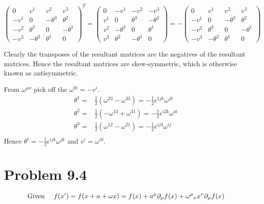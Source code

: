 \documentclass{article}
\begin{document}
\[\begin{pmatrix}0&v^1&v^2&v^3\\-v^1&0&-\theta^3&\theta^2\\-v^2&\theta^3&0&-\theta^1\\-v^3&-\theta^2&\theta^1&0\end{pmatrix}^T=\begin{pmatrix}0&-v^1&-v^2&-v^3\\v^1&0&\theta^3&-\theta^2\\v^2&-\theta^3&0&\theta^1\\v^3&\theta^2&-\theta^1&0\end{pmatrix}=-\begin{pmatrix}0&v^1&v^2&v^3\\-v^1&0&-\theta^3&\theta^2\\-v^2&\theta^3&0&-\theta^1\\-v^3&-\theta^2&\theta^1&0\end{pmatrix}\]

Clearly the transposes of the resultant matrices are the negatives of the resultant matrices. Hence the resultant matrices are skew-symmetric, which is otherwise known as antisymmetric. 

From $\omega^{\mu\nu}$ pick off the $\omega^{0i}=-v^i$.
\begin{align*}
	\theta^1= & \frac{1}{2}(\omega^{23}-\omega^{32})=-\frac{1}{2}\epsilon^{1jk}\omega^{jk}  \\
	\theta^2= & \frac{1}{2}(-\omega^{13}+\omega^{31})=-\frac{1}{2}\epsilon^{i2k}\omega^{ik} \\
	\theta^3= & \frac{1}{2}(\omega^{12}-\omega^{21})=-\frac{1}{2}\epsilon^{ij3}\omega^{ij}  \\
\end{align*}
Hence $\theta^i=-\frac{1}{2}\epsilon^{ijk}\omega^{jk}$ and $v^i=\omega^{i0}$.

\section*{Problem 9.4}

\[\qq*{Given } f(x^\prime) = f(x+a+\omega x) = f(x)+a^\mu \partial_\mu f(x)+{\omega^\mu}_\nu x^\nu \partial_\mu f(x)\]
\end{document}
